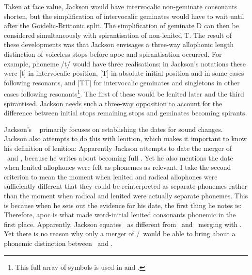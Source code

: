 Taken at face value, Jackson would have intervocalic non-geminate consonants shorten, but the simplification of intervocalic geminates would have to wait until after the Goidelic-Brittonic split. The simplification of geminate \gls{D} can then be considered simultaneously with spirantisation of non-lenited \gls{T}. The result of these developments was that Jackson envisages a three-way allophonic length distinction of voiceless stops before \gls{apoc} and spirantisation occurred. For example, phoneme /t/ would have three realisations: in Jackson's notations these were [t] in intervocalic position, [T] in absolute initial position and in some cases following  resonants, and [TT] for intervocalic geminates and singletons in other cases following  resonants\footnote{This full array of symbols is used in \textcite{Jac_Gemination60} and \textcite{Jac_Historical67}.}. The first of these would be lenited later and the third spirantised. Jackson needs such a three-way opposition  to account for the difference between initial stops remaining stops and geminates becoming spirants. 


Jackson's ~\autocite*{jackson_language_1953} primarily focuses on establishing the dates for sound changes. Jackson also attempts to do this with lenition, which makes it important to know his definition of lenition:
Apparently Jackson attempts to date the merger of \lT\ and \xD, because he writes about  becoming full . Yet he also mentions the date when lenited allophones were felt as phonemes as  relevant. I take the second criterion to mean the moment when lenited and radical allophones were sufficiently different that they could be reinterpreted as separate phonemes rather than the moment when radical and lenited were actually separate phonemes. This is because when he sets out the evidence for his date, the first thing he notes is:
Therefore, \gls{apoc} is what made word-initial lenited consonants phonemic in the first place. Apparently, Jackson equates  \lT\ as different from \xT\ and  \lT\ merging with \xD. Yet there is no reason why only a merger of \lT/\xD\ would be able to bring about a phonemic distinction between \xT\ and \lT.

